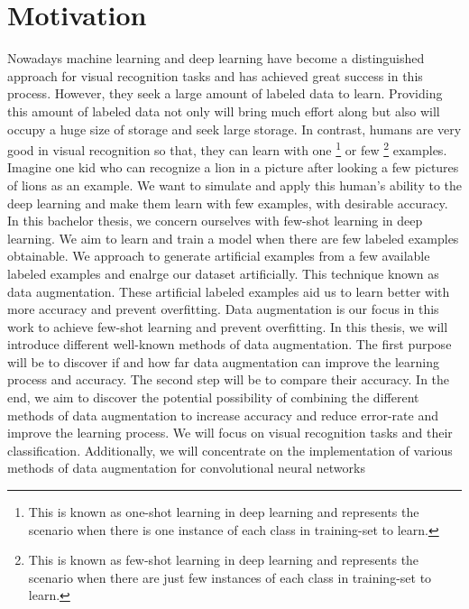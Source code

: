 \chapter{Motivation}

Nowadays machine learning and deep learning have become a distinguished approach for visual
recognition tasks and has achieved great success in this process. However, they seek a large amount of
labeled data to learn. Providing this amount of labeled data not only will bring much effort along but also will occupy a huge size of storage and seek large storage. In
contrast, humans are very good in visual recognition so that, they can learn with one \footnote{This
  is known as one-shot learning in deep learning and represents the scenario when there is one
  instance of each class in training-set to learn.} or few \footnote{This is known as few-shot learning in
  deep learning and represents the scenario when there are just few instances of each class in
  training-set to learn.}
examples. Imagine one kid who can recognize a lion in a picture
after looking a few pictures of lions as an example. We want to simulate and apply this human’s
ability to
the deep learning and make them learn with few examples, with desirable accuracy.
In this bachelor thesis, we concern ourselves with few-shot learning in deep learning. We aim to
learn and train a model when there are few labeled examples obtainable. We approach to generate
artificial examples from a few available labeled examples and enalrge our dataset artificially.
This technique known as data augmentation. These artificial labeled examples aid us to learn better
with more accuracy and prevent overfitting. Data augmentation is our focus in this work to achieve few-shot
learning and prevent overfitting. In this thesis, we will introduce different well-known methods of
data augmentation. The first purpose will be to discover if and how far data augmentation can
improve the learning process and accuracy. The second step will be to compare their accuracy. In
the end, we aim to discover the potential possibility of combining the different methods of data
augmentation to increase accuracy and reduce error-rate and improve the learning process.
We will focus on visual recognition tasks and their classification. Additionally, we will concentrate on the implementation of various methods of data augmentation for convolutional neural networks


